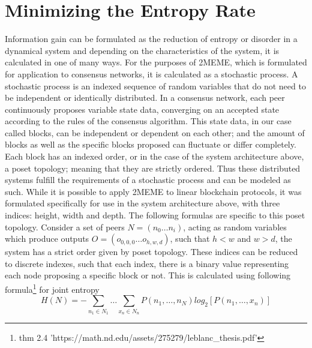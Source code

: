 \documentclass{article}
\begin{document}
\section{Minimizing the Entropy Rate}
Information gain can be formulated as the reduction of entropy or disorder in a dynamical system and depending on the characteristics of the system, it is calculated in one of many ways. For the purposes of 2MEME, which is formulated for application to consensus networks, it is calculated as a stochastic process.
	A stochastic process is an indexed sequence of random variables that do not need to be independent or identically distributed. In a consensus network, each peer continuously proposes variable state data, converging on an accepted state according to the rules of the consensus algorithm. This state data, in our case called blocks, can be independent or dependent on each other; and the amount of blocks as well as the specific blocks proposed can fluctuate or differ completely. Each block has an indexed order, or in the case of the system architecture above, a poset topology; meaning that they are strictly ordered. Thus these distributed systems fulfill the requirements of a stochastic process and can be modeled as such. While it is possible to apply 2MEME to linear blockchain protocols, it was formulated specifically for use in the system architecture above, with three indices: height, width and depth. The following formulas are specific to this poset topology.
	Consider a set of peers $N = (n_0 …n_i)$, acting as random variables which produce outputs $O = (o_{0,0,0} … o_{h,w,d})$, such that $h<w$ and $w>d$, the system has a strict order given by poset topology. These indices can be reduced to discrete indexes, such that each index, there is a binary value representing each node proposing a specific block or not. This is calculated using following formula\footnote{thm 2.4 'https://math.nd.edu/assets/275279/leblanc\_thesis.pdf'} for joint entropy	
\begin{equation}
H(N) = -\sum_{n_1 \in N_1} \dots \sum_{x_n \in N_n} P(n_1,  \dots, n_N) log_2 [P(n_1, \dots, x_n)]
\end{equation}
	
\end{document}
